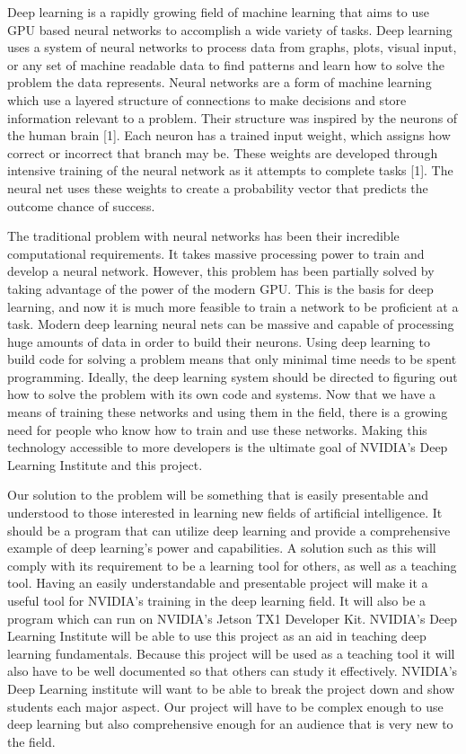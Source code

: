\documentclass[letterpaper,10pt]{article}
\begin{document}
Deep learning is a rapidly growing field of machine learning that aims to use GPU based neural networks to accomplish a wide variety of tasks.
Deep learning uses a system of neural networks to process data from graphs, plots, visual input, or any set of machine readable data to find patterns and learn how to solve the problem the data represents.
Neural networks are a form of machine learning which use a layered structure of connections to make decisions and store information relevant to a problem.
Their structure was inspired by the neurons of the human brain [1].
Each neuron has a trained input weight, which assigns how correct or incorrect that branch may be.
These weights are developed through intensive training of the neural network as it attempts to complete tasks [1].
The neural net uses these weights to create a probability vector that predicts the outcome chance of success.


The traditional problem with neural networks has been their incredible computational requirements.
 It takes massive processing power to train and develop a neural network.
 However, this problem has been partially solved by taking advantage of the power of the modern GPU.
 This is the basis for deep learning, and now it is much more feasible to train a network to be proficient at a task.
 Modern deep learning neural nets can be massive and capable of processing huge amounts of data in order to build their neurons.
 Using deep learning to build code for solving a problem means that only minimal time needs to be spent programming.
 Ideally, the deep learning system should be directed to figuring out how to solve the problem with its own code and systems.
 Now that we have a means of training these networks and using them in the field, there is a growing need for people who know how to train and use these networks.
 Making this technology accessible to more developers is the ultimate goal of NVIDIA's Deep Learning Institute and this project.


Our solution to the problem will be something that is easily presentable and understood to those interested in learning new fields of artificial intelligence.
 It should be a program that can utilize deep learning and provide a comprehensive example of deep learning's power and capabilities.
 A solution such as this will comply with its requirement to be a learning tool for others, as well as a teaching tool.
 Having an easily understandable and presentable project will make it a useful tool for NVIDIA's training in the deep learning field.
 It will also be a program which can run on NVIDIA's Jetson TX1 Developer Kit.
 NVIDIA's Deep Learning Institute will be able to use this project as an aid in teaching deep learning fundamentals.
 Because this project will be used as a teaching tool it will also have to be well documented so that others can study it effectively.
 NVIDIA's Deep Learning institute will want to be able to break the project down and show students each major aspect.
 Our project will have to be complex enough to use deep learning but also comprehensive enough for an audience that is very new to the field.
\end{document}
